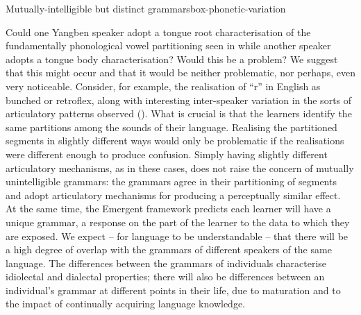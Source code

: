 \begin{dadpbox}{Mutually-intelligible but distinct grammars}{box-phonetic-variation}

Could one Yangben  speaker adopt a tongue root characterisation of the fundamentally phonological vowel partitioning seen in  while another speaker adopts a tongue body characterisation? Would this be a problem? We suggest that this might occur and that it would be neither problematic, nor perhaps, even very noticeable. Consider, for example, the realisation of ``r'' in English as bunched or retroflex, along with interesting inter-speaker variation in the sorts of articulatory patterns observed (\citealt{Archangeli+:2011Paris, Mielke+:2016}). What is crucial is that the learners identify the same partitions among the sounds of their language. Realising the partitioned segments in slightly different ways would only be problematic if the realisations were different enough to produce confusion. Simply having slightly different articulatory mechanisms, as in these cases, does not raise the concern of mutually unintelligible grammars: the grammars agree in their partitioning of segments and adopt articulatory mechanisms for producing a perceptually similar effect. \\

At the same time, the Emergent framework predicts each learner will have a unique grammar, a response on the part of the learner to the data to which they are exposed. We expect -- for language to be understandable -- that there will be a high degree of overlap with the grammars of different speakers of the same language. The differences between the grammars of individuals characterise idiolectal and dialectal properties; there will also be differences between an individual's grammar at different points in their life, due to maturation and to the impact of continually acquiring language knowledge.
\end{dadpbox}


